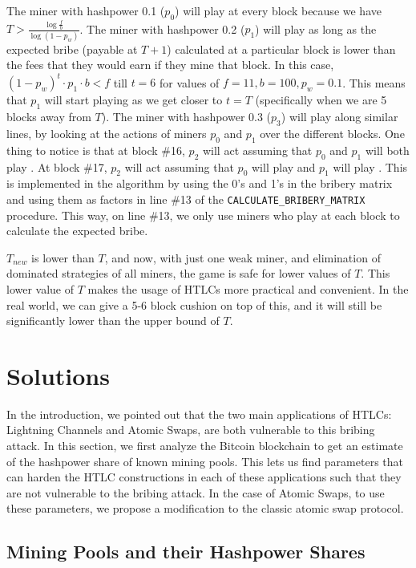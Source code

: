 The miner with hashpower 0.1 ($p_0$) will play  at every block because we have $T > \frac{\log \frac{f}{b}}{\log (1-p_w)}$. The miner with hashpower 0.2 ($p_1$) will play  as long as the expected bribe (payable at $T+1$) calculated at a particular block is lower than the fees that they would earn if they mine that block. In this case, $(1- p_w)^t \cdot p_1 \cdot b < f$ till $t = 6$ for values of $f = 11, b = 100, p_w = 0.1$. This means that $p_1$ will start playing \follow{} as we get closer to $t = T$ (specifically when we are 5 blocks away from $T$). The miner with hashpower 0.3 ($p_3$) will play  along similar lines, by looking at the actions of miners $p_0$ and $p_1$ over the different blocks. One thing to notice is that at block \#16, $p_2$ will act assuming that $p_0$ and $p_1$ will both play . At block \#17, $p_2$ will act assuming that $p_0$ will play  and $p_1$ will play \follow{}. This is implemented in the algorithm by using the 0's and 1's in the bribery matrix and using them as factors in line \#13 of the \texttt{CALCULATE\_BRIBERY\_MATRIX} procedure. This way, on line \#13, we only use miners who play  at each block to calculate the expected bribe.

$T_{new}$ is lower than $T$, and now, with just one weak miner, and elimination of dominated strategies of all miners, the game is safe for lower values of $T$. This lower value of $T$ makes the usage of HTLCs more practical and convenient. In the real world, we can give a 5-6 block cushion on top of this, and it will still be significantly lower than the upper bound of $T$.

\section{Solutions}
\label{section:solutions}
In the introduction, we pointed out that the two main applications of HTLCs: Lightning Channels and Atomic Swaps, are both vulnerable to this bribing attack. In this section, we first analyze the Bitcoin blockchain to get an estimate of the hashpower share of known mining pools. This lets us find parameters that can harden the HTLC constructions in each of these applications such that they are not vulnerable to the bribing attack. In the case of Atomic Swaps, to use these parameters, we propose a modification to the classic atomic swap protocol.

\subsection{Mining Pools and their Hashpower Shares}\label{section:mining_pools}

